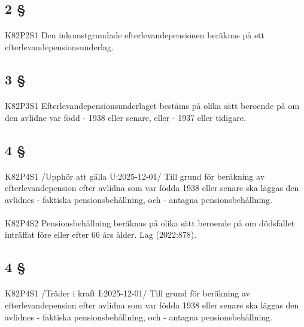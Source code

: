 \documentclass[a4paper,notitlepage,openany,10pt]{book}
\begin{document}
\subsection*{2 §}
\paragraph*{}
{\tiny K82P2S1}
Den inkomstgrundade efterlevandepensionen beräknas på ett efterlevandepensionsunderlag.
\subsection*{3 §}
\paragraph*{}
{\tiny K82P3S1}
Efterlevandepensionsunderlaget bestäms på olika sätt beroende på om den avlidne var född
\newline - 1938 eller senare, eller
\newline - 1937 eller tidigare.
\subsection*{4 §}
\paragraph*{}
{\tiny K82P4S1}
/Upphör att gälla U:2025-12-01/
Till grund för beräkning av efterlevandepension efter avlidna som var födda 1938 eller senare ska läggas den avlidnes
\newline - faktiska pensionsbehållning, och
\newline - antagna pensionsbehållning.
\paragraph*{}
{\tiny K82P4S2}
Pensionsbehållning beräknas på olika sätt beroende på om dödsfallet inträffat före eller efter 66 års ålder.
Lag (2022:878).
\subsection*{4 §}
\paragraph*{}
{\tiny K82P4S1}
/Träder i kraft I:2025-12-01/
Till grund för beräkning av efterlevandepension efter avlidna som var födda 1938 eller senare ska läggas den avlidnes
\newline - faktiska pensionsbehållning, och
\newline - antagna pensionsbehållning.
\end{document}
